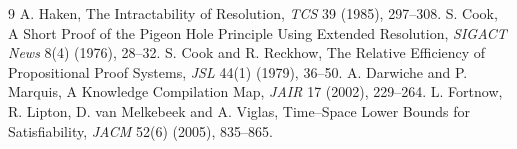 \documentclass[11pt]{article}
\begin{document}
\begin{thebibliography}{9}
 A. Haken, The Intractability of Resolution, \emph{TCS} 39 (1985), 297--308.
 S. Cook, A Short Proof of the Pigeon Hole Principle Using Extended Resolution, \emph{SIGACT News} 8(4) (1976), 28--32.
 S. Cook and R. Reckhow, The Relative Efficiency of Propositional Proof Systems, \emph{JSL} 44(1) (1979), 36--50.
 A. Darwiche and P. Marquis, A Knowledge Compilation Map, \emph{JAIR} 17 (2002), 229--264.
 L. Fortnow, R. Lipton, D. van Melkebeek and A. Viglas, Time--Space Lower Bounds for Satisfiability, \emph{JACM} 52(6) (2005), 835--865.
\end{thebibliography}
\end{document}
